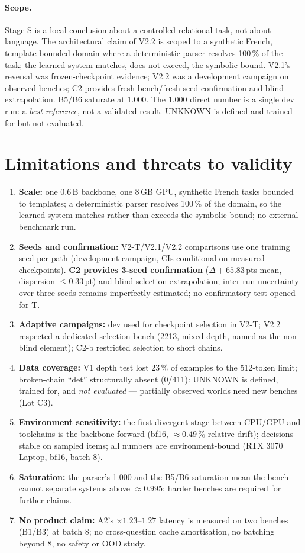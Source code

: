 \documentclass[11pt,a4paper]{article}
\newcommand{\dpt}{\ensuremath{\Delta}}
\begin{document}
\paragraph{Scope.} Stage S is a local conclusion about a controlled relational task, not about language. The architectural claim of V2.2 is scoped to a synthetic French, template-bounded domain where a deterministic parser resolves 100\,\% of the task; the learned system matches, does not exceed, the symbolic bound. V2.1's reversal was frozen-checkpoint evidence; V2.2 was a development campaign on observed benches; C2 provides fresh-bench/fresh-seed confirmation and blind extrapolation. B5/B6 saturate at 1.000. The 1.000 direct number is a single dev run: a \emph{best reference}, not a validated result. UNKNOWN is defined and trained for but not evaluated.

\section{Limitations and threats to validity}

\begin{enumerate}
\item \textbf{Scale:} one 0.6\,B backbone, one 8\,GB GPU, synthetic French tasks bounded to templates; a deterministic parser resolves 100\,\% of the domain, so the learned system matches rather than exceeds the symbolic bound; no external benchmark run.
\item \textbf{Seeds and confirmation:} V2-T/V2.1/V2.2 comparisons use one training seed per path (development campaign, CIs conditional on measured checkpoints). \textbf{C2 provides 3-seed confirmation} ($\dpt+65.83$\,pts mean, dispersion $\le0.33$\,pt) and blind-selection extrapolation; inter-run uncertainty over three seeds remains imperfectly estimated; no confirmatory test opened for T.
\item \textbf{Adaptive campaigns:} dev used for checkpoint selection in V2-T; V2.2 respected a dedicated selection bench (2213, mixed depth, named as the non-blind element); C2-b restricted selection to short chains.
\item \textbf{Data coverage:} V1 depth test lost 23\,\% of examples to the 512-token limit; broken-chain ``det'' structurally absent (0/411): UNKNOWN is defined, trained for, and \emph{not evaluated} --- partially observed worlds need new benches (Lot C3).
\item \textbf{Environment sensitivity:} the first divergent stage between CPU/GPU and toolchains is the backbone forward (bf16, $\approx0.49$\,\% relative drift); decisions stable on sampled items; all numbers are environment-bound (RTX 3070 Laptop, bf16, batch 8).
\item \textbf{Saturation:} the parser's 1.000 and the B5/B6 saturation mean the bench cannot separate systems above $\approx0.995$; harder benches are required for further claims.
\item \textbf{No product claim:} A2's $\times1.23$--$1.27$ latency is measured on two benches (B1/B3) at batch 8; no cross-question cache amortisation, no batching beyond 8, no safety or OOD study.
\end{enumerate}
\end{document}
